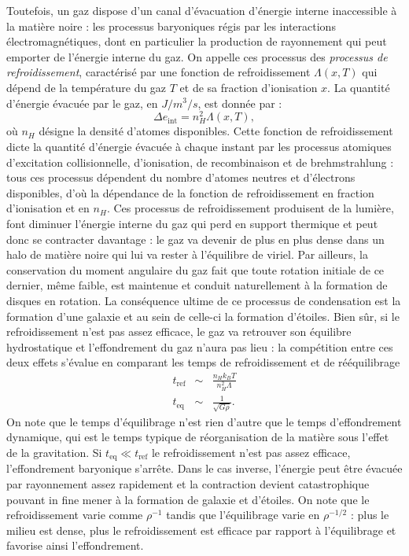 Toutefois, un gaz dispose d'un canal d'évacuation d'énergie interne inaccessible à la matière noire : les processus baryoniques régis par les interactions électromagnétiques, dont en particulier la production de rayonnement qui peut emporter de l'énergie interne du gaz. On appelle ces processus des \textit{processus de refroidissement}, caractérisé par une fonction de refroidissement $\Lambda(x,T)$ qui dépend de la température du gaz $T$ et de sa fraction d'ionisation $x$. La quantité d'énergie évacuée par le gaz, en $J/m^3/s$, est donnée par :
\begin{equation}
\Delta e_\mathrm{int}=n_H^2 \Lambda(x,T),
\end{equation}
où $n_H$ désigne la densité d'atomes disponibles.
Cette fonction de refroidissement dicte la quantité d'énergie évacuée à chaque instant par les processus atomiques d'excitation collisionnelle, d'ionisation, de recombinaison et de brehmstrahlung : tous ces processus dépendent du nombre d'atomes neutres et d'électrons disponibles, d'où la dépendance de la fonction de refroidissement en fraction d'ionisation et en $n_H$. Ces processus de refroidissement produisent de la lumière, font diminuer l'énergie interne du gaz qui perd en support thermique et peut donc se contracter davantage : le gaz va devenir de plus en plus dense dans un halo de matière noire qui lui va rester à l'équilibre de viriel. Par ailleurs, la conservation du moment angulaire du gaz fait que toute rotation initiale de ce dernier, même faible, est maintenue et conduit naturellement à la formation de disques en rotation. 
La conséquence ultime de ce processus de condensation est la formation d'une galaxie et au sein de celle-ci la formation d'étoiles. Bien sûr, si le refroidissement n'est pas assez efficace, le gaz va retrouver son équilibre hydrostatique et l'effondrement du gaz n'aura pas lieu : la compétition entre ces deux effets s'évalue en comparant les temps de refroidissement et de rééquilibrage
\begin{eqnarray}
t_\mathrm{ref}&\sim &\frac{n_H k_BT}{n_H^2\Lambda}\\
t_\mathrm{eq}&\sim &\frac{1}{\sqrt{G\rho}}.
\end{eqnarray}
On note que le temps d'équilibrage n'est rien d'autre que le temps d'effondrement dynamique, qui est le temps typique de réorganisation de la matière sous l'effet de la gravitation. Si $t_\mathrm{eq}\ll t_\mathrm{ref}$ le refroidissement n'est pas assez efficace, l'effondrement baryonique s'arrête. Dans le cas inverse, l'énergie peut être évacuée par rayonnement assez rapidement et la contraction devient catastrophique pouvant in fine mener à la formation de galaxie et d'étoiles. On note que le refroidissement varie comme $\rho^{-1}$ tandis que l'équilibrage varie en $\rho^{-1/2}$ : plus le milieu est dense, plus le refroidissement est efficace par rapport à l'équilibrage et favorise ainsi l'effondrement. 

